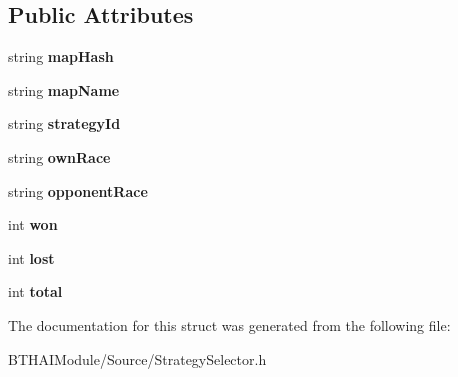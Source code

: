 \subsection*{Public Attributes}
\begin{DoxyCompactItemize}
\item 
\hypertarget{struct_strategy_stats_ad923c68ee2777b2444bb0ef8c6833e7a}{string {\bfseries map\-Hash}}\label{struct_strategy_stats_ad923c68ee2777b2444bb0ef8c6833e7a}

\item 
\hypertarget{struct_strategy_stats_a6a31927d482c47c2a5aeeb1bcf0bb7ef}{string {\bfseries map\-Name}}\label{struct_strategy_stats_a6a31927d482c47c2a5aeeb1bcf0bb7ef}

\item 
\hypertarget{struct_strategy_stats_aaf9abe65a0525bded8076f6cafdfb66b}{string {\bfseries strategy\-Id}}\label{struct_strategy_stats_aaf9abe65a0525bded8076f6cafdfb66b}

\item 
\hypertarget{struct_strategy_stats_a5a2e716a504abd2d4d406977bf07c573}{string {\bfseries own\-Race}}\label{struct_strategy_stats_a5a2e716a504abd2d4d406977bf07c573}

\item 
\hypertarget{struct_strategy_stats_a254c046461d8f2c5b6b639cd41c16c0b}{string {\bfseries opponent\-Race}}\label{struct_strategy_stats_a254c046461d8f2c5b6b639cd41c16c0b}

\item 
\hypertarget{struct_strategy_stats_a27c4489755fdc0faa1e3057e303495fb}{int {\bfseries won}}\label{struct_strategy_stats_a27c4489755fdc0faa1e3057e303495fb}

\item 
\hypertarget{struct_strategy_stats_ac37678277f06fe4a1e31133da7b4002b}{int {\bfseries lost}}\label{struct_strategy_stats_ac37678277f06fe4a1e31133da7b4002b}

\item 
\hypertarget{struct_strategy_stats_aecb474ddf03d15d4bf8aab208dddc2b9}{int {\bfseries total}}\label{struct_strategy_stats_aecb474ddf03d15d4bf8aab208dddc2b9}

\end{DoxyCompactItemize}


The documentation for this struct was generated from the following file\-:\begin{DoxyCompactItemize}
\item 
B\-T\-H\-A\-I\-Module/\-Source/Strategy\-Selector.\-h\end{DoxyCompactItemize}

